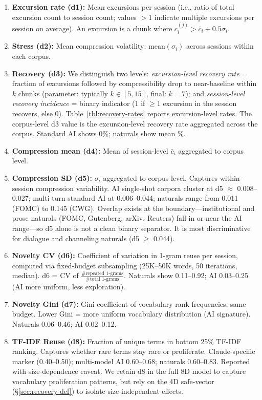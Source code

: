 \documentclass[11pt]{article}
\begin{document}
\begin{enumerate}
\item \textbf{Excursion rate (d1):} Mean excursions per session (i.e., ratio of total excursion count to session count; values $>$1 indicate multiple excursions per session on average). An excursion is a chunk where $c_i^{(j)} > \bar{c}_i + 0.5 \sigma_i$.

\item \textbf{Stress (d2):} Mean compression volatility: $\text{mean}(\sigma_i)$ across sessions within each corpus.

\item \textbf{Recovery (d3):} We distinguish two levels: \textit{excursion-level recovery rate} = fraction of excursions followed by compressibility drop to near-baseline within $k$ chunks (parameter: typically $k \in [5, 15]$, final: $k=7$); and \textit{session-level recovery incidence} = binary indicator (1 if $\geq$1 excursion in the session recovers, else 0). Table~\ref{tbl:recovery-rates} reports excursion-level rates. The corpus-level d3 value is the excursion-level recovery rate aggregated across the corpus. Standard AI shows 0\%; naturals show mean \recNatCorpusAvg\%.

\item \textbf{Compression mean (d4):} Mean of session-level $\bar{c}_i$ aggregated to corpus level.

\item \textbf{Compression SD (d5):} $\sigma_i$ aggregated to corpus level. Captures within-session compression variability. AI single-shot corpora cluster at d5 $\approx$ 0.008--0.027; multi-turn standard AI at 0.006--0.044; naturals range from 0.011 (FOMC) to 0.145 (CWG). Overlap exists at the boundary---institutional and prose naturals (FOMC, Gutenberg, arXiv, Reuters) fall in or near the AI range---so d5 alone is not a clean binary separator. It is most discriminative for dialogue and channeling naturals (d5 $\geq$ 0.044).

\item \textbf{Novelty CV (d6):} Coefficient of variation in 1-gram reuse per session, computed via fixed-budget subsampling (25K--50K words, 50 iterations, median). d6 = CV of $\frac{\text{\#repeated 1-grams}}{\text{\#total 1-grams}}$. Naturals show 0.11--0.92; AI 0.03--0.25 (AI more uniform, less exploration).

\item \textbf{Novelty Gini (d7):} Gini coefficient of vocabulary rank frequencies, same budget. Lower Gini = more uniform vocabulary distribution (AI signature). Naturals 0.06--0.46; AI 0.02--0.12.

\item \textbf{TF-IDF Reuse (d8):} Fraction of unique terms in bottom 25\% TF-IDF ranking. Captures whether rare terms stay rare or proliferate. Claude-specific marker (0.40--0.50); multi-model AI 0.60--0.68; naturals 0.60--0.83. Reported with size-dependence caveat. We retain d8 in the full 8D model to capture vocabulary proliferation patterns, but rely on the 4D safe-vector (\S\ref{sec:recovery-def}) to isolate size-independent effects.
\end{enumerate}
\end{document}
